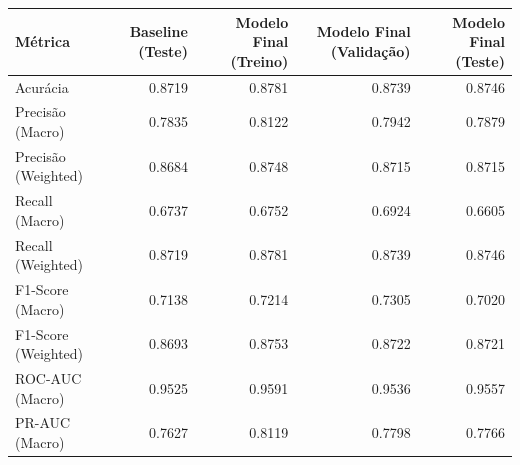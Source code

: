 \begin{tabular}{lrrrr}
\toprule
Métrica & Baseline (Teste) & Modelo Final (Treino) & Modelo Final (Validação) & Modelo Final (Teste) \\
\midrule
Acurácia & 0.8719 & 0.8781 & 0.8739 & 0.8746 \\
Precisão (Macro) & 0.7835 & 0.8122 & 0.7942 & 0.7879 \\
Precisão (Weighted) & 0.8684 & 0.8748 & 0.8715 & 0.8715 \\
Recall (Macro) & 0.6737 & 0.6752 & 0.6924 & 0.6605 \\
Recall (Weighted) & 0.8719 & 0.8781 & 0.8739 & 0.8746 \\
F1-Score (Macro) & 0.7138 & 0.7214 & 0.7305 & 0.7020 \\
F1-Score (Weighted) & 0.8693 & 0.8753 & 0.8722 & 0.8721 \\
ROC-AUC (Macro) & 0.9525 & 0.9591 & 0.9536 & 0.9557 \\
PR-AUC (Macro) & 0.7627 & 0.8119 & 0.7798 & 0.7766 \\
\bottomrule
\end{tabular}

